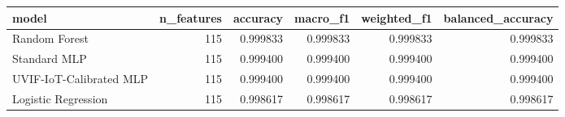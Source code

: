 \begin{tabular}{lrrrrr}
\toprule
model & n\_features & accuracy & macro\_f1 & weighted\_f1 & balanced\_accuracy \\
\midrule
Random Forest & 115 & 0.999833 & 0.999833 & 0.999833 & 0.999833 \\
Standard MLP & 115 & 0.999400 & 0.999400 & 0.999400 & 0.999400 \\
UVIF-IoT-Calibrated MLP & 115 & 0.999400 & 0.999400 & 0.999400 & 0.999400 \\
Logistic Regression & 115 & 0.998617 & 0.998617 & 0.998617 & 0.998617 \\
\bottomrule
\end{tabular}
